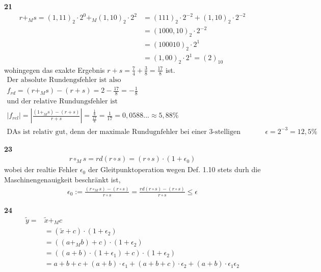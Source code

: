 \documentclass[13pt]{scrreprt}
\newenvironment{ebox}[1]{\textbf{#1}\\}{}
\begin{document}
\begin{ebox}{21}
	\begin{align*}
	r + _{M} s = (1,11)_2 \cdot 2^0 +_{M} (1,10)_2 \cdot 2^2 &= (111)_2 \cdot 2^{-2} + (1,10)_2 \cdot 2^{-2}\\
	&= (1000,10)_2 \cdot 2^{-2}\\
	&= (100010)_2 \cdot 2^1\\
	&= (1,00)_2 \cdot 2^1 = (2)_{10}
	\end{align*}
	wohingegen das exakte Ergebnis $ r+s = \frac74 + \frac38= \frac{17}{8}$ ist.\\
	\begin{align*}
	\text{Der absolute Rundengsfehler ist also}\\
	f_{rd} = (r+_M s) - (r + s) = 2 -\frac{17}{8} = -\frac{1}{8}\\
	\text{und der relative Rundungsfehler ist}\\
	|f_{rel}| = |\frac{(1 +_M s)-(r+s)}{r+s}| = \frac{\frac18}{\frac{17}{8}} = \frac{1}{17} = 0,0588... \approx 5,88\%\\
	\text{DAs ist relativ gut, denn der maximale Rundugnfehler bei einer 3-stelligen Mantisse ist} \quad \epsilon =   2^{-3} = 12,5\%
	\end{align*}
\end{ebox}


\begin{ebox}{23}
	\begin{align*}
	r \circ_M s = rd(r \circ s) = (r\circ s)\cdot(1 + \epsilon_0)
	\end{align*}
	wobei der realtie Fehler $\epsilon_0$ der Gleitpunktoperation wegen Def. 1.10 stets durh die Maschinengenauigkeit beschränkt ist,
	\begin{align*}
	\epsilon_0 := \frac{(r\circ_M s)-(r \circ s)}{r \circ s} = \frac{rd(r \circ s) - (r \circ s)}{r \circ s} \leqslant \epsilon
	\end{align*}
\end{ebox}

\begin{ebox}{24}
	\begin{align*}
		\tilde{y} =& \tilde{x} +_M c \\
		&= (\tilde{x} + c) \cdot (1+ \epsilon_2)\\
		&= ((a +_M b) + c) \cdot (1+ \epsilon_2)\\
		&= ((a + b) \cdot (1+ \epsilon_1) + c) \cdot (1+ \epsilon_2)\\
		&= a + b + c + (a+b)\cdot\epsilon_1 + (a + b +c)\cdot\epsilon_2 + (a+b)\cdot\epsilon_1\epsilon_2
	\end{align*}
\end{ebox}
\end{document}
